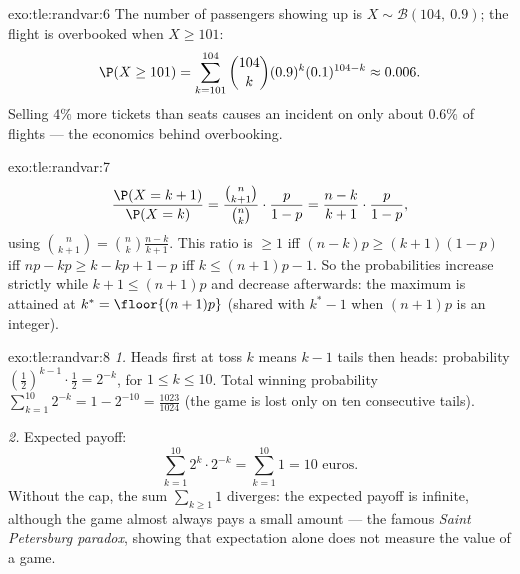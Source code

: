 \begin{solution}{exo:tle:randvar:6}
The number of passengers showing up is $X \sim \mathcal B(104,\ 0.9)$; the
flight is overbooked when $X \geq 101$:
\[
\P(X \geq 101) = \sum_{k=101}^{104}\binom{104}{k}(0.9)^k(0.1)^{104-k}
\approx 0.006 .
\]
Selling $4\%$ more tickets than seats causes an incident on only about
$0.6\%$ of flights --- the economics behind overbooking.
\end{solution}

\begin{solution}{exo:tle:randvar:7}
\[
\frac{\P(X = k+1)}{\P(X = k)}
= \frac{\binom{n}{k+1}}{\binom nk}\cdot\frac{p}{1-p}
= \frac{n - k}{k + 1}\cdot\frac{p}{1-p},
\]
using $\binom{n}{k+1} = \binom nk \frac{n-k}{k+1}$. This ratio is $\geq 1$
iff $(n-k)p \geq (k+1)(1-p)$ iff $np - k p \geq k - kp + 1 - p$ iff
$k \leq (n+1)p - 1$. So the probabilities increase strictly while
$k + 1 \leq (n+1)p$ and decrease afterwards: the maximum is attained at
$k^* = \floor{(n+1)p}$ (shared with $k^* - 1$ when $(n+1)p$ is an
integer).
\end{solution}

\begin{solution}{exo:tle:randvar:8}
\emph{1.} Heads first at toss $k$ means $k-1$ tails then heads:
probability $\left(\frac12\right)^{k-1}\cdot\frac12 = 2^{-k}$, for
$1 \leq k \leq 10$. Total winning probability
$\sum_{k=1}^{10} 2^{-k} = 1 - 2^{-10} = \frac{1023}{1024}$ (the game is
lost only on ten consecutive tails).

\emph{2.} Expected payoff:
\[
\sum_{k=1}^{10} 2^k \cdot 2^{-k} = \sum_{k=1}^{10} 1 = 10 \text{ euros}.
\]
Without the cap, the sum $\sum_{k\geq1} 1$ diverges: the expected payoff is
infinite, although the game almost always pays a small amount --- the
famous \emph{Saint Petersburg paradox}, showing that expectation alone does
not measure the value of a game.
\end{solution}

